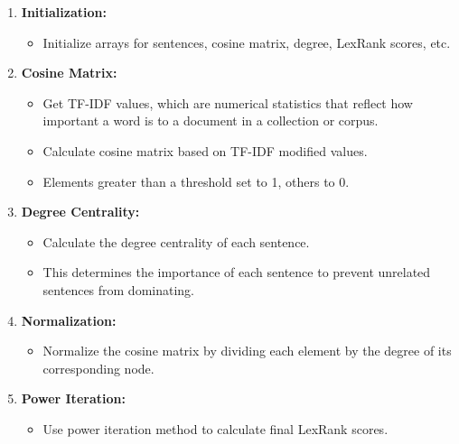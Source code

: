 \documentclass{ieeeaccess}
\begin{document}
\begin{enumerate}
    \item \textbf{Initialization:}
    \begin{itemize}
        \item Initialize arrays for sentences, cosine matrix, degree, LexRank scores, etc.
    \end{itemize}
    
    \item \textbf{Cosine Matrix:}
    \begin{itemize}
        \item Get TF-IDF values, which are numerical statistics that reflect how important a word is to a document in a collection or corpus.
        \item Calculate cosine matrix based on TF-IDF modified values.
        \item Elements greater than a threshold set to 1, others to 0.
    \end{itemize}
    
    \item \textbf{Degree Centrality:}
    \begin{itemize}
        \item Calculate the degree centrality of each sentence.
        \item This determines the importance of each sentence to prevent unrelated sentences from dominating.
    \end{itemize}
    
    \item \textbf{Normalization:}
    \begin{itemize}
        \item Normalize the cosine matrix by dividing each element by the degree of its corresponding node.
    \end{itemize}
    
    \item \textbf{Power Iteration:}
    \begin{itemize}
        \item Use power iteration method to calculate final LexRank scores.
    \end{itemize}
\end{enumerate}
\end{document}
